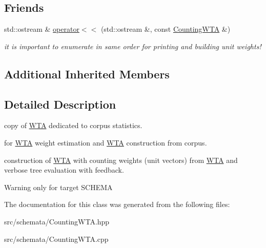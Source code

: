 \subsection*{Friends}
\begin{DoxyCompactItemize}
\item 
\mbox{\label{classCountingWTA_a59c54deace0f2f8b53e43f1c59ac1106}} 
std\+::ostream \& \mbox{\hyperlink{classCountingWTA_a59c54deace0f2f8b53e43f1c59ac1106}{operator$<$$<$}} (std\+::ostream \&, const \mbox{\hyperlink{classCountingWTA}{Counting\+W\+TA}} \&)
\begin{DoxyCompactList}\small\item\em it is important to enumerate in same order for printing and building unit weights! \end{DoxyCompactList}\end{DoxyCompactItemize}
\subsection*{Additional Inherited Members}


\subsection{Detailed Description}
copy of \mbox{\hyperlink{classWTA}{W\+TA}} dedicated to corpus statistics. 

for \mbox{\hyperlink{classWTA}{W\+TA}} weight estimation and \mbox{\hyperlink{classWTA}{W\+TA}} construction from corpus.

construction of \mbox{\hyperlink{classWTA}{W\+TA}} with counting weights (unit vectors) from \mbox{\hyperlink{classWTA}{W\+TA}} and verbose tree evaluation with feedback.

\begin{DoxyWarning}{Warning}
only for target S\+C\+H\+E\+MA 
\end{DoxyWarning}


The documentation for this class was generated from the following files\+:\begin{DoxyCompactItemize}
\item 
src/schemata/Counting\+W\+T\+A.\+hpp\item 
src/schemata/Counting\+W\+T\+A.\+cpp\end{DoxyCompactItemize}
